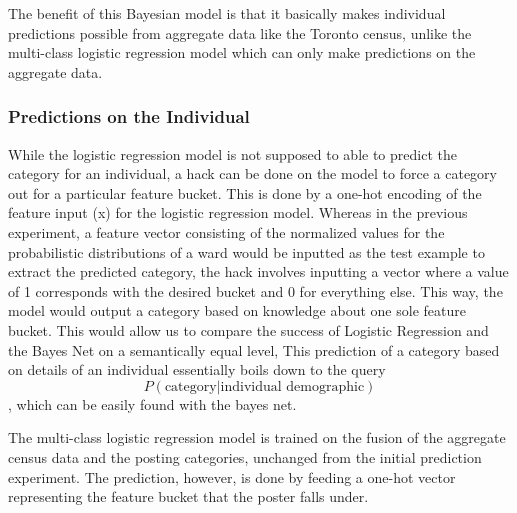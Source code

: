 \documentclass[12pt]{article}
\begin{document}


The benefit of this Bayesian model is that it basically makes individual predictions possible from aggregate data like the Toronto census, unlike the multi-class logistic regression model which can only make predictions on the aggregate data.  

\subsubsection{Predictions on the Individual}
While the logistic regression model is not supposed to able to predict the category for an individual, a hack can be done on the model to force a category out for a particular feature bucket. This is done by a one-hot encoding of the feature input (x) for the logistic regression model. Whereas in the previous experiment, a feature vector consisting of the normalized values for the probabilistic distributions of a ward would be inputted as the test example to extract the predicted category, the hack involves inputting a vector where a value of 1 corresponds with the desired bucket and 0 for everything else. This way, the model would output a category based on knowledge about one sole feature bucket. This would allow us to compare the success of Logistic Regression and the Bayes Net on a semantically equal level, 
This prediction of a category based on details of an individual essentially boils down to the query  \[P(\text{category} | \text{individual demographic})\], which can be easily found with the bayes net. 

The multi-class logistic regression model is trained on the fusion of the aggregate census data and the posting categories, unchanged from the initial prediction experiment. The prediction, however, is done by feeding a one-hot vector representing the feature bucket that the poster falls under. 
\end{document}

